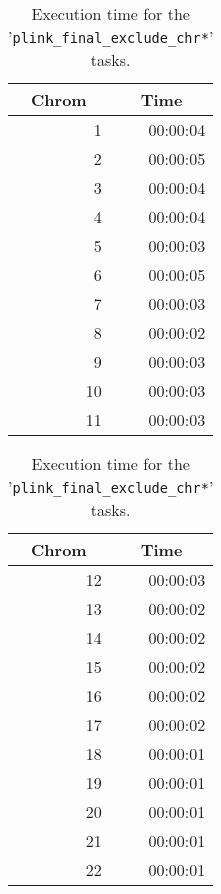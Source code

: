 \documentclass[10pt,twoside,english]{scrartcl}
\begin{document}
\begin{table}[H]
\protect\caption{Execution time for the '\texttt{plink\_final\_exclude\_chr*}' tasks.\label{tab:plink_final_exclude_exec_time}}

\centering

\begin{tabular}{rr}
\hline 
\multicolumn{1}{c}{\textbf{Chrom}}
 & \multicolumn{1}{c}{\textbf{Time}}
\\
\hline 

1 & {\color{light_gray}00:00:0}4\\
2 & {\color{light_gray}00:00:0}5\\
3 & {\color{light_gray}00:00:0}4\\
4 & {\color{light_gray}00:00:0}4\\
5 & {\color{light_gray}00:00:0}3\\
6 & {\color{light_gray}00:00:0}5\\
7 & {\color{light_gray}00:00:0}3\\
8 & {\color{light_gray}00:00:0}2\\
9 & {\color{light_gray}00:00:0}3\\
10 & {\color{light_gray}00:00:0}3\\
11 & {\color{light_gray}00:00:0}3\\
\hline 
\end{tabular}
\hspace{1cm}
\begin{tabular}{rr}
\hline 
\multicolumn{1}{c}{\textbf{Chrom}}
 & \multicolumn{1}{c}{\textbf{Time}}
\\
\hline 

12 & {\color{light_gray}00:00:0}3\\
13 & {\color{light_gray}00:00:0}2\\
14 & {\color{light_gray}00:00:0}2\\
15 & {\color{light_gray}00:00:0}2\\
16 & {\color{light_gray}00:00:0}2\\
17 & {\color{light_gray}00:00:0}2\\
18 & {\color{light_gray}00:00:0}1\\
19 & {\color{light_gray}00:00:0}1\\
20 & {\color{light_gray}00:00:0}1\\
21 & {\color{light_gray}00:00:0}1\\
22 & {\color{light_gray}00:00:0}1\\
\hline 
\end{tabular}


\end{table}
\end{document}
